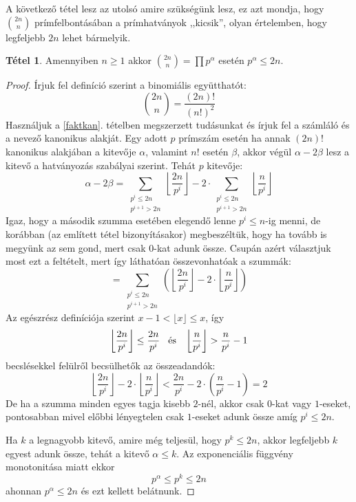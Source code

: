 \documentclass[12pt]{book}
\theoremstyle{plain} %
\theoremstyle{definition} %
\newtheorem{theo/}{Tétel}[section]
\newenvironment{theo}
  {\renewcommand{\qedsymbol}{$\clubsuit$}%
   \pushQED{\qed}\begin{theo/}}
  {\popQED\end{theo/}}
\theoremstyle{remark}
\renewcommand\qedsymbol{$\blacksquare$}
\numberwithin{equation}{section}  %
\begin{document}
	A következő tétel lesz az utolsó amire szükségünk lesz, ez azt mondja, hogy ${2n\choose n}$ prímfelbontásában a prímhatványok ,,kicsik'', olyan értelemben, hogy legfeljebb $2n$ lehet bármelyik.

	\begin{theo}\label{otodik}
		Amennyiben $n\geq 1$ akkor ${2n\choose n} = \displaystyle\prod p^{\alpha}$ esetén $p^{\alpha} \leq 2n$.
	\end{theo}

	\begin{proof}
		Írjuk fel definíció szerint a binomiális együtthatót:
		\[ {2n\choose n} = \dfrac{(2n)!}{(n!)^2}  \]
		Használjuk a \ref{faktkan}. tételben megszerzett tudásunkat és írjuk fel a számláló és a nevező kanonikus alakját. Egy adott $p$ prímszám esetén ha annak $(2n)!$ kanonikus alakjában a kitevője $\alpha$, valamint $n!$ esetén $\beta$, akkor végül $\alpha-2\beta$ lesz a kitevő a hatványozás szabályai szerint. Tehát $p$ kitevője:
		\[ \alpha - 2\beta = \sum\limits_{\substack{p^i\leq 2n \\ p^{i+1}>2n}} \left \lfloor \dfrac{2n}{p^i} \right \rfloor - 2 \cdot \sum\limits_{\substack{p^i\leq 2n \\ p^{i+1}>2n}} \left \lfloor \dfrac{n}{p^i} \right \rfloor  \]
		Igaz, hogy a második szumma esetében elegendő lenne $p^i\leq n$-ig menni, de korábban (az említett tétel bizonyításakor) megbeszéltük, hogy ha tovább is megyünk az sem gond, mert csak $0$-kat adunk össze. Csupán azért választjuk most ezt a feltételt, mert így láthatóan összevonhatóak a szummák:
		\[ = \sum\limits_{\substack{p^i\leq 2n \\ p^{i+1}>2n}} \left( \left \lfloor \dfrac{2n}{p^i} \right \rfloor - 2\cdot  \left \lfloor \dfrac{n}{p^i} \right \rfloor \right) \]
		Az egészrész definíciója szerint $x-1< \lfloor x \rfloor \leq x$, így
		\[ \left \lfloor \dfrac{2n}{p^i} \right \rfloor \leq \dfrac{2n}{p^i} \hspace{3mm} \text{és} \hspace{3mm}   \left \lfloor \dfrac{n}{p^i} \right \rfloor > \dfrac{n}{p^i} - 1  \]
		becslésekkel felülről becsülhetők az összeadandók:
		\[  \left \lfloor \dfrac{2n}{p^i} \right \rfloor - 2\cdot  \left \lfloor \dfrac{n}{p^i} \right \rfloor < \dfrac{2n}{p^i} - 2\cdot \left( \dfrac{n}{p^i} - 1 \right)  =  2  \]
		De ha a szumma minden egyes tagja kisebb $2$-nél, akkor csak $0$-kat vagy $1$-eseket, pontosabban mivel előbbi lényegtelen csak $1$-eseket adunk össze amíg $p^i\leq 2n$.
		
		Ha $k$ a legnagyobb kitevő, amire még teljesül, hogy $p^k\leq 2n$, akkor legfeljebb $k$ egyest adunk össze, tehát a kitevő $\alpha \leq k$. Az exponenciális függvény monotonitása miatt ekkor
		\[ p^\alpha \leq p^k \leq 2n  \]
		ahonnan $p^\alpha \leq 2n$ és ezt kellett belátnunk.
	\end{proof}
\end{document}
